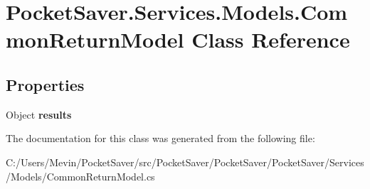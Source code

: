\hypertarget{class_pocket_saver_1_1_services_1_1_models_1_1_common_return_model}{}\section{Pocket\+Saver.\+Services.\+Models.\+Common\+Return\+Model Class Reference}
\label{class_pocket_saver_1_1_services_1_1_models_1_1_common_return_model}
\subsection*{Properties}
\begin{DoxyCompactItemize}
\item 
\mbox{\label{class_pocket_saver_1_1_services_1_1_models_1_1_common_return_model_a5576a42cbc2c7860a69e9f8953a628e0}} 
Object {\bfseries results}
\end{DoxyCompactItemize}


The documentation for this class was generated from the following file\+:\begin{DoxyCompactItemize}
\item 
C\+:/\+Users/\+Mevin/\+Pocket\+Saver/src/\+Pocket\+Saver/\+Pocket\+Saver/\+Pocket\+Saver/\+Services/\+Models/Common\+Return\+Model.\+cs\end{DoxyCompactItemize}
